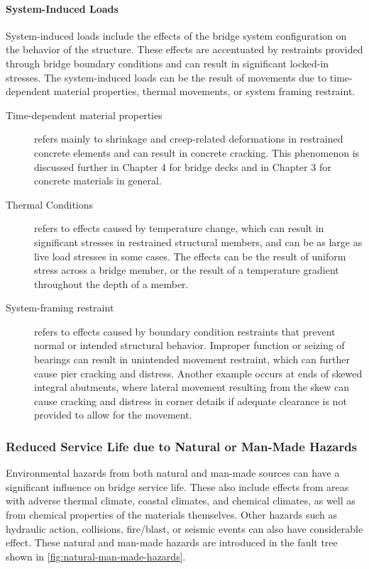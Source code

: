 \paragraph{System-Induced Loads}
System-induced loads include the effects of the bridge system configuration on the behavior of the structure. These effects are accentuated by restraints provided through bridge boundary conditions and can result in significant locked-in stresses. The system-induced loads can be the result of movements due to time-dependent material properties, thermal movements, or system framing restraint.

\begin{description}
  \item [Time-dependent material properties] refers mainly to shrinkage and creep-related deformations in restrained
  concrete elements and can result in concrete cracking. This phenomenon is discussed further in Chapter 4 for bridge
  decks and in Chapter 3 for concrete materials in general.
  \item [Thermal Conditions] refers to effects caused by temperature change, which can result in significant stresses in
  restrained structural members, and can be as large as live load stresses in some cases. The effects can be the result of
  uniform stress across a bridge member, or the result of a temperature gradient throughout the depth of a member.
  \item [System-framing restraint] refers to effects caused by boundary condition restraints that prevent normal or
  intended structural behavior. Improper function or seizing of bearings can result in unintended movement restraint,
  which can further cause pier cracking and distress. Another example occurs at ends of skewed integral abutments,
  where lateral movement resulting from the skew can cause cracking and distress in corner details if adequate
  clearance is not provided to allow for the movement.
\end{description}

\subsubsection{Reduced Service Life due to Natural or Man-Made Hazards}

Environmental hazards from both natural and man-made sources can have a significant influence on bridge
service life. These also include effects from areas with adverse thermal climate, coastal climates, and chemical
climates, as well as from chemical properties of the materials themselves. Other hazards such as hydraulic action,
collisions, fire/blast, or seismic events can also have considerable effect. These natural and man-made hazards are
introduced in the fault tree shown in \cref{fig:natural-man-made-hazards}.

